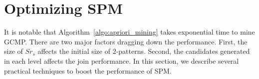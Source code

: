 \section{Optimizing SPM}
\label{sec:optimization}
It is notable that Algorithm~\ref{algo:apriori_mining} takes exponential
time to mine GCMP. There are two major factors dragging 
down the performance. First, the size of $Sr_s$ affects the initial 
size of $2$-patterns. Second, the candidates generated in each 
level affects the join performance.
In this section, we describe several practical techniques to boost the performance
of SPM.
%
%

